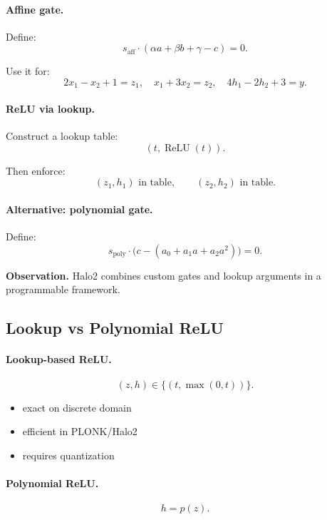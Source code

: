 \paragraph{Affine gate.}

Define:
\[
s_{\mathrm{aff}} \cdot (\alpha a + \beta b + \gamma - c) = 0.
\]

Use it for:
\[
2x_1 - x_2 + 1 = z_1, \quad
x_1 + 3x_2 = z_2, \quad
4h_1 - 2h_2 + 3 = y.
\]

\paragraph{ReLU via lookup.}

Construct a lookup table:
\[
(t, \operatorname{ReLU}(t)).
\]

Then enforce:
\[
(z_1, h_1) \text{ in table}, \qquad
(z_2, h_2) \text{ in table}.
\]

\paragraph{Alternative: polynomial gate.}

Define:
\[
s_{\mathrm{poly}} \cdot \big(c - (a_0 + a_1 a + a_2 a^2)\big) = 0.
\]

\medskip

\noindent
\textbf{Observation.}  
Halo2 combines custom gates and lookup arguments in a programmable framework.

\subsection{Lookup vs Polynomial ReLU}

\paragraph{Lookup-based ReLU.}
\[
(z,h) \in \{(t,\max(0,t))\}.
\]

\begin{itemize}
\item exact on discrete domain
\item efficient in PLONK/Halo2
\item requires quantization
\end{itemize}

\paragraph{Polynomial ReLU.}
\[
h = p(z).
\]

